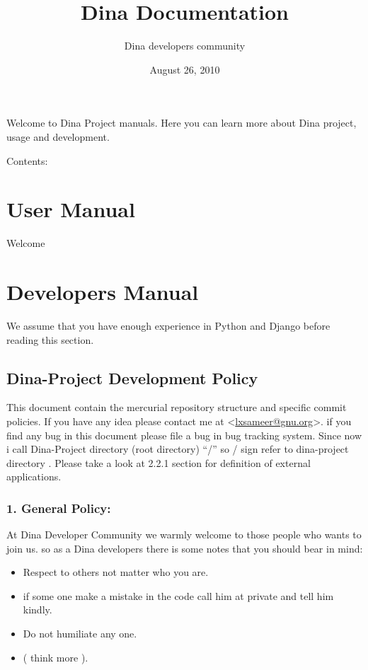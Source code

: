 \documentclass[letterpaper,10pt,english]{manual}
\title{Dina Documentation}
\date{August 26, 2010}
\author{Dina developers community}
\begin{document}
\maketitle
\tableofcontents
\hypertarget{--doc-index}{}


Welcome to Dina Project manuals. Here you can learn more about Dina project, usage and development.

Contents:

\resetcurrentobjects
\hypertarget{--doc-users/index}{}

\chapter{User Manual}

Welcome

\resetcurrentobjects
\hypertarget{--doc-devel/index}{}

\chapter{Developers Manual}

We assume that you have enough experience in Python and Django before reading this section.

\resetcurrentobjects
\hypertarget{--doc-devel/policy}{}

\section{Dina-Project Development Policy}

This document contain the mercurial repository structure and specific commit policies.
If you have any idea please contact me at \textless{}\href{mailto:lxsameer@gnu.org}{lxsameer@gnu.org}\textgreater{}. if you find any bug in this document please file a bug in bug tracking system.
Since now i call Dina-Project directory (root directory) ``/'' so / sign refer to dina-project directory .
Please take a look at 2.2.1 section for definition of external applications.


\subsection{1. General Policy:}

At Dina Developer Community we warmly welcome to those people who wants to join us. so
as a Dina developers there is some notes that you should bear in mind:
\begin{itemize}
\item {} 
Respect to others not matter who you are.

\item {} 
if some one make a mistake in the code call him at private and tell him kindly.

\item {} 
Do not humiliate any one.

\item {} 
( think more ).

\end{itemize}
\end{document}
